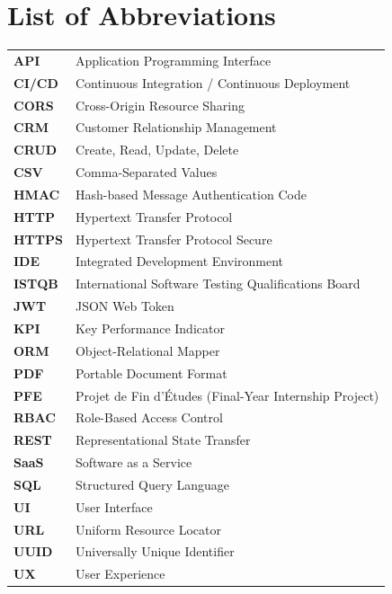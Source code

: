 \documentclass[12pt,a4paper]{report}
\begin{document}

\listoftables
\clearpage


\chapter*{List of Abbreviations}
{}

\renewcommand{\arraystretch}{1.4}
\begin{tabular}{p{2.6cm} p{11cm}}
  \textbf{API}    & Application Programming Interface \\
  \textbf{CI/CD}  & Continuous Integration / Continuous Deployment \\
  \textbf{CORS}   & Cross-Origin Resource Sharing \\
  \textbf{CRM}    & Customer Relationship Management \\
  \textbf{CRUD}   & Create, Read, Update, Delete \\
  \textbf{CSV}    & Comma-Separated Values \\
  \textbf{HMAC}   & Hash-based Message Authentication Code \\
  \textbf{HTTP}   & Hypertext Transfer Protocol \\
  \textbf{HTTPS}  & Hypertext Transfer Protocol Secure \\
  \textbf{IDE}    & Integrated Development Environment \\
  \textbf{ISTQB}  & International Software Testing Qualifications Board \\
  \textbf{JWT}    & JSON Web Token \\
  \textbf{KPI}    & Key Performance Indicator \\
  \textbf{ORM}    & Object-Relational Mapper \\
  \textbf{PDF}    & Portable Document Format \\
  \textbf{PFE}    & Projet de Fin d'Études (Final-Year Internship Project) \\
  \textbf{RBAC}   & Role-Based Access Control \\
  \textbf{REST}   & Representational State Transfer \\
  \textbf{SaaS}   & Software as a Service \\
  \textbf{SQL}    & Structured Query Language \\
  \textbf{UI}     & User Interface \\
  \textbf{URL}    & Uniform Resource Locator \\
  \textbf{UUID}   & Universally Unique Identifier \\
  \textbf{UX}     & User Experience \\
\end{tabular}
\end{document}
